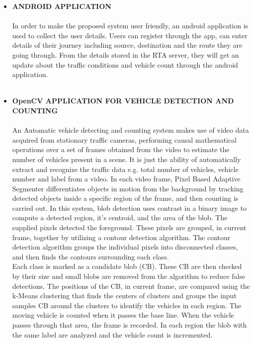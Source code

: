 \begin{itemize}
\item \textbf{ANDROID APPLICATION}\\ \\
In order to make the proposed system user friendly, an android application is used to collect the user details. Users can register through the app, can enter details of their journey including source, destination and the route they are going through. From the details stored in the RTA server, they will get an update about the traffic conditions and vehicle count through the android application. \\ \\
\item \textbf{OpenCV APPLICATION FOR VEHICLE DETECTION AND COUNTING}\\ \\
An Automatic vehicle detecting and counting system makes use of video data acquired from stationary traffic cameras, performing causal mathematical operations over a set of frames obtained from the video to estimate the number of vehicles present in a scene. It is just the ability of automatically extract and recognize the traffic data e.g. total number of vehicles, vehicle number and label from a video. In each video frame, Pixel Based Adaptive Segmenter differentiates objects in motion from the background by tracking detected objects inside a specific region of the frame, and then counting is carried out. In this system, blob detection uses contrast in a binary image to compute a detected region, it’s centroid, and the area of the blob. The supplied pixels detected the foreground. These pixels are grouped, in current frame, together by utilizing a contour detection algorithm. The contour detection algorithm groups the individual pixels into disconnected classes, and then finds the contours surrounding each class. \\
Each class is marked as a candidate blob (CB). These CB are then checked by their size and small blobs are removed from the algorithm to reduce false detections. The positions of the CB, in current frame, are compared using the k-Means clustering that finds the centers of clusters and groups the input samples CB around the clusters to identify the vehicles in each region. The moving vehicle is counted when it passes the base line. When the vehicle passes through that area, the frame is recorded. In each region the blob with the same label are analyzed and the vehicle count is incremented.\\ \\

\end{itemize}
